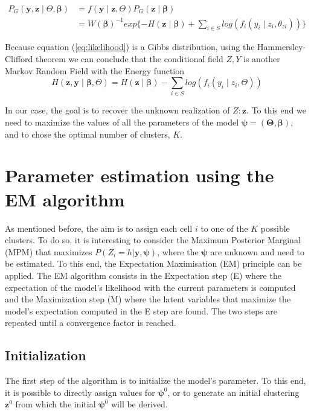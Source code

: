 \begin{align}
\label{eq:likelihood}
P_G(\boldsymbol{y},\boldsymbol{z} \mid \Theta, \boldsymbol{\beta}) &= f(\boldsymbol{y} \mid \boldsymbol{z}, \Theta)P_G(\boldsymbol{z} \mid \boldsymbol{\beta})\nonumber\\
&= W(\boldsymbol{\beta})^{-1}exp\{{-H(\boldsymbol{z} \mid \boldsymbol{\beta})} + \sum\limits_{i \in S}log(f_i(y_i \mid z_i, \theta_{zi}))\}
\end{align}

Because equation (\ref{eq:likelihood}) is a Gibbs distribution, using the Hammersley-Clifford theorem we can conclude that the conditional field $Z, Y$ is another Markov Random Field with the Energy function 
\[H(\boldsymbol{z}, \boldsymbol{y} \mid \boldsymbol{\beta}, \Theta) = H(\boldsymbol{z} \mid \boldsymbol{\beta}) - \sum\limits_{i \in S} log(f_i(y_i \mid z_i, \Theta))\]

In our case, the goal is to recover the unknown realization of $Z: \boldsymbol{z}$. To this end we need to maximize the values of all the parameters of the model $\boldsymbol{\psi} = (\boldsymbol{\Theta}, \boldsymbol{\beta})$, and to chose the optimal number of clusters, $K$.

\section{Parameter estimation using the EM algorithm}
As mentioned before, the aim is to assign each cell $i$ to one of the $K$ possible clusters. To do so, it is interesting to consider the Maximum Posterior Marginal (MPM) that maximizes $P(Z_{i}=h|\boldsymbol{y}, \boldsymbol{\psi})$, where the $\boldsymbol{\psi}$ are unknown and need to be estimated. To this end, the Expectation Maximisation \citep{dempster77} (EM) principle can be applied. The EM algorithm consists in the Expectation step (E) where the expectation of the model's likelihood with the current parameters is computed and the Maximization step (M) where the latent variables that maximize the model's expectation computed in the E step are found. The two steps are repeated until a convergence factor is reached.\\

	\subsection{Initialization}
The first step of the algorithm is to initialize the model's parameter. To this end, it is possible to directly assign values for $\boldsymbol{\psi}^{0}$, or to generate an initial clustering $\boldsymbol{z}^{0}$ from which the initial $\boldsymbol{\psi}^{0}$ will be derived.\\

